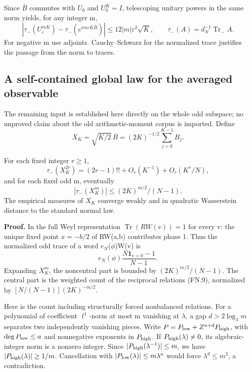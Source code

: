 Since \(\bar B\) commutes with \(U_{0}\) and \(U_0^K=I\), telescoping unitary powers in the same norm yields, for any integer m, \[
 \left|\tau_-(U_\varepsilon^{mK})
       -\tau_-(e^{im\varepsilon K\overline B})\right|
 \leq12|m|\varepsilon^2\sqrt K,\qquad
 \tau_-(A)=d_N^{-1}\operatorname{Tr}_{-}A.                      \tag{FN.17}
\] For negative m use adjoints. Cauchy--Schwarz for the normalized trace justifies the passage from the norm to traces.

\subsection{A self-contained global law for the averaged observable}\label{floquet:a-self-contained-global-law-for-the-averaged-observable}

The remaining input is established here directly on the whole odd subspace; no unproved claim about the old arithmetic-moment corpus is imported. Define \[
 X_K=\sqrt{K/2}\,\overline B=(2K)^{-1/2}\sum_{j=0}^{K-1}B_j.
\]

\begin{lemma}\label{pass1:ch07_floquet_resonance-3} For each fixed integer \(r\geq1\), \[
 \tau_-(X_K^{2r})=(2r-1)!!+O_r(K^{-1})+O_r(K^r/N),               \tag{FN.18}
\] and for each fixed odd m, eventually \[
 |\tau_-(X_K^m)|\leq (2K)^{m/2}/(N-1).                         \tag{FN.19}
\] The empirical measures of \(X_{K}\) converge weakly and in quadratic Wasserstein distance to the standard normal law.
\end{lemma}

\textbf{Proof.} In the full Weyl representation \(\operatorname{Tr}(RW(v))=1\) for every v: the unique fixed point \(x=-b/2\) of RW(a,b) contributes phase 1. Thus the normalized odd trace of a word \(e_{N}\)(\(\phi\))W(v) is \[
 e_N(\phi)\frac{N\mathbf1_{v=0}-1}{N-1}.                       \tag{FN.20}
\] Expanding \(X_K^m\), the noncentral part is bounded by \((2K)^{m/2}/(N-1)\). The central part is the weighted count of the reciprocal relations (FN.9), normalized by \([N/(N-1)](2K)^{-m/2}\).

Here is the count including structurally forced nonbalanced relations. For a polynomial of coefficient \(\ell^1\)-norm at most m vanishing at \(\lambda\), a gap \(d>2\log_\lambda m\) separates two independently vanishing pieces. Write \(P=P_{\rm low}+Z^{a+d}P_{\rm high}\), with \(\deg P_{\rm low}\leq a\) and nonnegative exponents in \(P_{\rm high}\). If \(P_{\rm high}(\lambda)\ne0\), its algebraic-integer norm is a nonzero integer. Since \(|P_{\rm high}(\lambda^{-1})|\leq m\), we have \(|P_{\rm high}(\lambda)|\geq1/m\). Cancellation with \(|P_{\rm low}(\lambda)|\leq m\lambda^a\) would force \(\lambda^d\leq m^2\), a contradiction.

